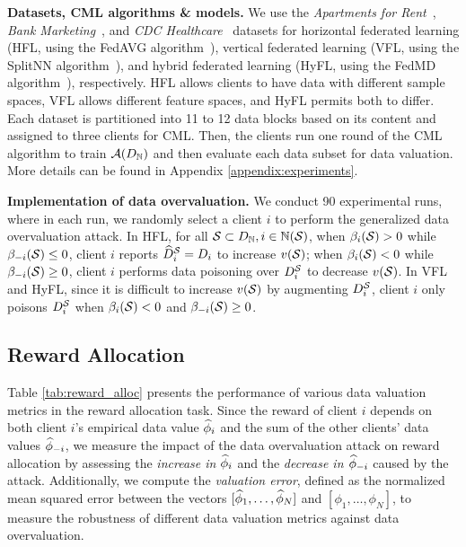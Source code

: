 \textbf{Datasets, CML algorithms \& models.}
We use the \textit{Apartments for Rent}~\citep{apartment_for_rent_classified_555}, \textit{Bank Marketing}~\citep{bank_marketing_222}, and \textit{CDC Healthcare}~\citep{cdc_health_indicators} datasets for horizontal federated learning (HFL, using the FedAVG algorithm~\citep{mcmahan2017communication}), vertical federated learning (VFL, using the SplitNN algorithm~\citep{gupta2018distributed}), and hybrid federated learning (HyFL, using the FedMD algorithm~\citep{li2019fedmd}), respectively. 
HFL allows clients to have data with different sample spaces, VFL allows different feature spaces, and HyFL permits both to differ. 
Each dataset is partitioned into 11 to 12 data blocks based on its content and assigned to three clients for CML.
Then, the clients run one round of the CML algorithm to train $\mathcal{A}(D_{\mathbb{N}})$ and then evaluate each data subset for data valuation.
More details can be found in Appendix \ref{appendix:experiments}.



\textbf{Implementation of data overvaluation.}
We conduct 90 experimental runs, where in each run, we randomly select a client $i$ to perform the generalized data overvaluation attack.
In HFL, for all $\mathcal{S} \subset D_{\mathbb{N}}, i \in \mathbb{N}(\mathcal{S})$, when $\beta_i(\mathcal{S}) > 0$ while $\beta_{-i}(\mathcal{S}) \leq 0$, client $i$ reports $\widehat{D}^{\mathcal{S}}_{i} = D_i$ to increase $v(\mathcal{S})$;
when $\beta_i(\mathcal{S}) < 0$ while $\beta_{-i}(\mathcal{S}) \geq 0$,
client $i$ performs data poisoning over $D^{\mathcal{S}}_{i}$ to decrease $v(\mathcal{S})$.
In VFL and HyFL, since it is difficult to increase $v(\mathcal{S})$ by augmenting $D^{\mathcal{S}}_{i}$, client $i$ only poisons $D^{\mathcal{S}}_{i}$ when $\beta_i(\mathcal{S}) < 0$ and $\beta_{-i}(\mathcal{S}) \geq 0$.

\subsection{Reward Allocation}
\label{sec:reward_alloc}
Table \ref{tab:reward_alloc} presents the performance of various data valuation metrics in the reward allocation task. 
Since the reward of client $i$ depends on both client $i$'s empirical data value $\widehat{\phi}_i$ and the sum of the other clients' data values $\widehat{\phi}_{-i}$, we measure the impact of the data overvaluation attack on reward allocation by assessing the \textit{increase in $\widehat{\phi}_i$} and the \textit{decrease in $\widehat{\phi}_{-i}$} caused by the attack.
Additionally, we compute the \textit{valuation error}, defined as the normalized mean squared error between the vectors $[\widehat{\phi}_1,\dots,\widehat{\phi}_N]$ and $[\phi_1,\dots,\phi_N]$, to measure the robustness of different data valuation metrics against data overvaluation.

